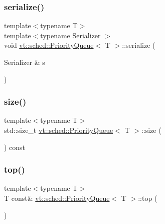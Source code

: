 \mbox{\label{structvt_1_1sched_1_1_priority_queue_a8003054ebf860d24a7825783f90941d9}} 
\subsubsection{\texorpdfstring{serialize()}{serialize()}}
{\footnotesize\ttfamily template$<$typename T$>$ \\
template$<$typename Serializer $>$ \\
void \hyperlink{structvt_1_1sched_1_1_priority_queue}{vt\+::sched\+::\+Priority\+Queue}$<$ T $>$\+::serialize (\begin{DoxyParamCaption}\item[{Serializer \&}]{s }\end{DoxyParamCaption})\hspace{0.3cm}{\ttfamily [inline]}}

\mbox{\label{structvt_1_1sched_1_1_priority_queue_a017313382884e652da648d274a09b80d}} 
\subsubsection{\texorpdfstring{size()}{size()}}
{\footnotesize\ttfamily template$<$typename T$>$ \\
std\+::size\+\_\+t \hyperlink{structvt_1_1sched_1_1_priority_queue}{vt\+::sched\+::\+Priority\+Queue}$<$ T $>$\+::size (\begin{DoxyParamCaption}{ }\end{DoxyParamCaption}) const\hspace{0.3cm}{\ttfamily [inline]}}

\mbox{\label{structvt_1_1sched_1_1_priority_queue_ad5f072e3452ba8b950456bc4b072deb1}} 
\subsubsection{\texorpdfstring{top()}{top()}}
{\footnotesize\ttfamily template$<$typename T$>$ \\
T const\& \hyperlink{structvt_1_1sched_1_1_priority_queue}{vt\+::sched\+::\+Priority\+Queue}$<$ T $>$\+::top (\begin{DoxyParamCaption}{ }\end{DoxyParamCaption})\hspace{0.3cm}{\ttfamily [inline]}}



